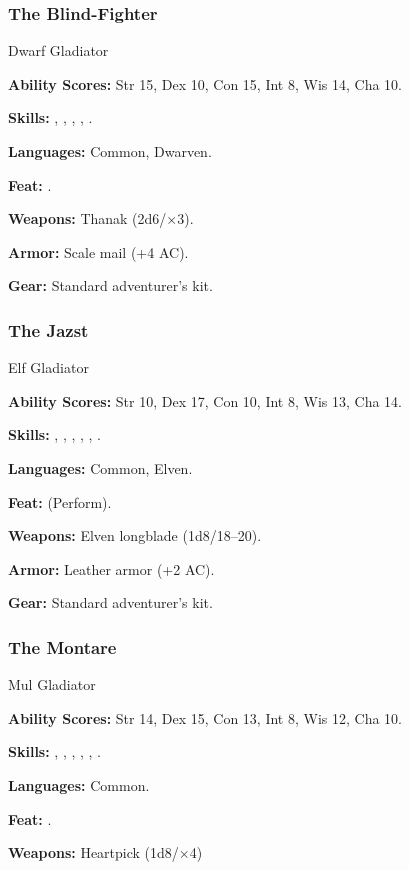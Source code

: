 \subsubsection{The Blind-Fighter}
Dwarf Gladiator

\textbf{Ability Scores:} Str 15, Dex 10, Con 15, Int 8, Wis 14, Cha 10.

\textbf{Skills:} , , , , .

\textbf{Languages:} Common, Dwarven.

\textbf{Feat:} .

\textbf{Weapons:} Thanak (2d6/$\times$3).

\textbf{Armor:} Scale mail (+4 AC).

\textbf{Gear:} Standard adventurer's kit.

\subsubsection{The Jazst}
Elf Gladiator

\textbf{Ability Scores:} Str 10, Dex 17, Con 10, Int 8, Wis 13, Cha 14.

\textbf{Skills:} , , , , , .

\textbf{Languages:} Common, Elven.

\textbf{Feat:}  (Perform).

\textbf{Weapons:} Elven longblade (1d8/18--20).

\textbf{Armor:} Leather armor (+2 AC).

\textbf{Gear:} Standard adventurer's kit.

\vskip2cm
\subsubsection{The Montare}
Mul Gladiator

\textbf{Ability Scores:} Str 14, Dex 15, Con 13, Int 8, Wis 12, Cha 10.

\textbf{Skills:} , , , , , .

\textbf{Languages:} Common.

\textbf{Feat:} .

\textbf{Weapons:} Heartpick (1d8/$\times$4)

